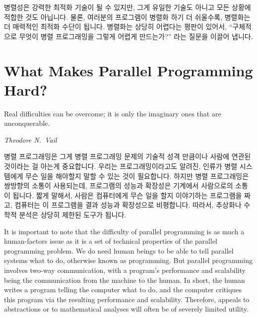 병렬성은 강력한 최적화 기술이 될 수 있지만, 그게 유일한 기술도 아니고 모든
상황에 적합한 것도 아닙니다.
물론, 여러분의 프로그램이 병렬화 하기 더 쉬울수록, 병렬화는 더 매력적인 최적화
수단이 됩니다.
병렬화는 상당히 어렵다는 평판이 있어서, ``구체적으로 무엇이 병렬 프로그래밍을
그렇게 어렵게 만드는가?'' 라는 질문을 이끌어 냅니다.

\section{What Makes Parallel Programming Hard?}
\label{sec:intro:What Makes Parallel Programming Hard?}
%
\epigraph{Real difficulties can be overcome; it is only the imaginary
	  ones that are unconquerable.}{\emph{Theodore N.~Vail}}


병렬 프로그래밍은 그게 병렬 프로그래밍 문제의 기술적 성격 만큼이나 사람에
연관된 것이라는 걸 아는게 중요합니다.
우리는 프로그래밍이라고도 알려진, 인류가 병렬 시스템에게 무슨 일을 해야할지
말할 수 있는 것이 필요합니다.
하지만 병렬 프로그래밍은 쌍방향의 소통이 사용되는데, 프로그램의 성능과 확장성은
기계에서 사람으로의 소통이 됩니다.
짧게 말해서, 사람은 컴퓨터에게 무슨 일을 할지 이야기하는 프로그램을 짜고,
컴퓨터는 이 프로그램을 결과 성능과 확장성으로 비평합니다.
따라서, 추상화나 수학적 분석은 상당히 제한된 도구가 됩니다.

\iffalse

It is important to note that the difficulty of parallel programming
is as much a human-factors issue as it is a set of technical properties of the
parallel programming problem.
We do need human beings to be able to tell parallel
systems what to do, otherwise known as programming.
But parallel programming involves two-way communication, with
a program's performance and scalability being the communication from
the machine to the human.
In short, the human writes a program telling the computer what to do,
and the computer critiques this program via the resulting performance and
scalability.
Therefore, appeals to abstractions or to mathematical analyses will
often be of severely limited utility.

